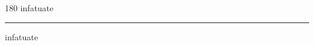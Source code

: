 
\begin{frame}
\begin{center}
\begin{turn}{180}
{\fontsize{2.5cm}{1em}\selectfont infatuate}
\end{turn}
\vspace{1em}\par  
\hrule
\vspace{1em}\par  
{\fontsize{2.5cm}{1em}\selectfont infatuate}
\end{center}
\end{frame}
